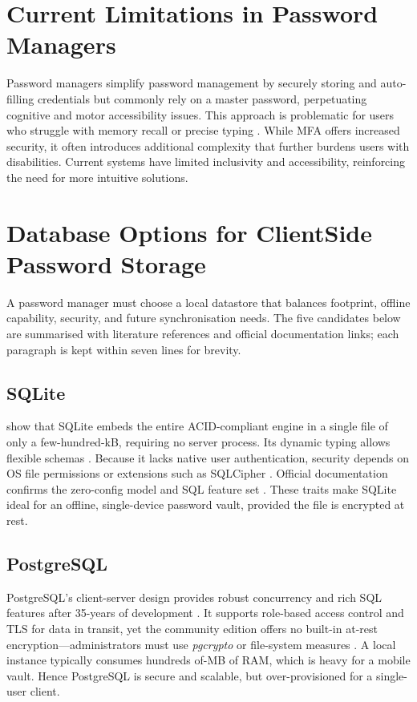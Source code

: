 \section{Current Limitations in Password Managers}
Password managers simplify password management by securely storing and auto-filling credentials but commonly rely on a master password, perpetuating cognitive and motor accessibility issues. This approach is problematic for users who struggle with memory recall or precise typing \autocite{IALabs2024}. While MFA offers increased security, it often introduces additional complexity that further burdens users with disabilities. Current systems have limited inclusivity and accessibility, reinforcing the need for more intuitive solutions.

\section{Database Options for Client\textendash Side Password Storage}
\label{sec:db-options}

A password manager must choose a local datastore that balances footprint,
offline capability, security, and future synchronisation needs.  The five
candidates below are summarised with literature references and official
documentation links; each paragraph is kept within seven lines for brevity.

\subsection*{SQLite}
\textcite{Gaffney2022} show that SQLite embeds the entire ACID-compliant
engine in a single file of only a few-hundred-kB, requiring no server
process.  Its dynamic typing allows flexible schemas \autocite{Corovcak2025}.
Because it lacks native user authentication, security depends on OS file
permissions or extensions such as SQLCipher \autocite{Corovcak2025}.
Official documentation confirms the zero-config model and SQL feature set
\autocite{sqlLiteDoc2025}.  These traits make SQLite ideal for an offline,
single-device password vault, provided the file is encrypted at rest.

\subsection*{PostgreSQL}
PostgreSQL's client-server design provides robust concurrency and rich SQL
features after 35-years of development \autocite{Gkamas2022}.  It supports
role-based access control and TLS for data in transit, yet the community
edition offers no built-in at-rest encryption—administrators must use
\textit{pgcrypto} or file-system measures \autocite{Crunchy2024,
PostgreSQL2025}.  A local instance typically consumes hundreds of-MB of RAM,
which is heavy for a mobile vault.  Hence PostgreSQL is secure and scalable,
but over-provisioned for a single-user client.

